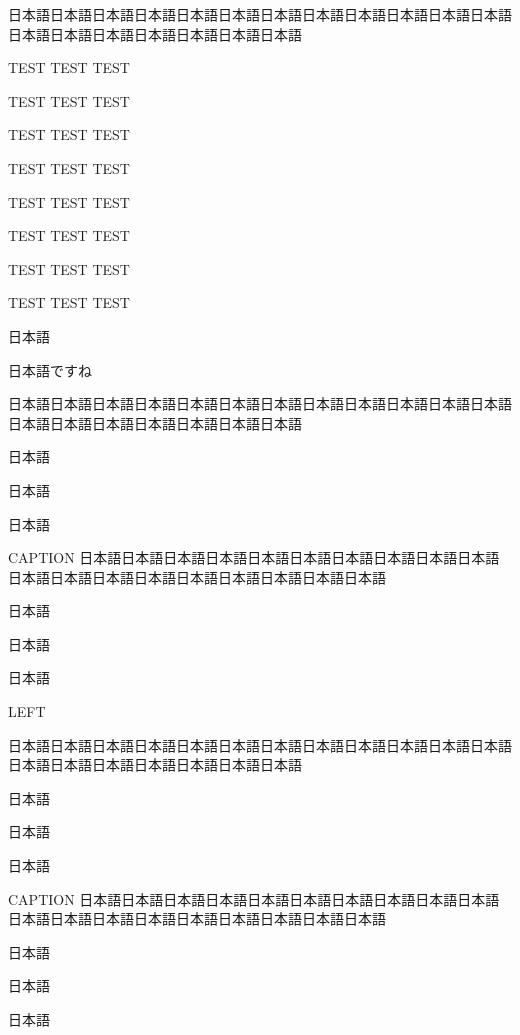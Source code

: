 \begin{rv@dottedbox@nocaption}
日本語日本語日本語日本語日本語日本語日本語日本語日本語日本語日本語日本語日本語日本語日本語日本語日本語日本語日本語

TEST TEST TEST

TEST TEST TEST

TEST TEST TEST

TEST TEST TEST

TEST TEST TEST

TEST TEST TEST

TEST TEST TEST

TEST TEST TEST

日本語

日本語ですね

\end{rv@dottedbox@nocaption}

\clearpage

\begin{rv@bothsidelinebox@nocaption}
日本語日本語日本語日本語日本語日本語日本語日本語日本語日本語日本語日本語日本語日本語日本語日本語日本語日本語日本語

日本語

日本語

日本語
\end{rv@bothsidelinebox@nocaption}

\begin{rv@bothsidelinebox@caption}{CAPTION}
日本語日本語日本語日本語日本語日本語日本語日本語日本語日本語日本語日本語日本語日本語日本語日本語日本語日本語日本語

日本語

日本語

日本語
\end{rv@bothsidelinebox@caption}

\clearpage

LEFT

\begin{rv@leftsidelinebox@nocaption}
日本語日本語日本語日本語日本語日本語日本語日本語日本語日本語日本語日本語日本語日本語日本語日本語日本語日本語日本語

日本語

日本語

日本語
\end{rv@leftsidelinebox@nocaption}

\begin{rv@leftsidelinebox@caption}{CAPTION}
日本語日本語日本語日本語日本語日本語日本語日本語日本語日本語日本語日本語日本語日本語日本語日本語日本語日本語日本語

日本語

日本語

日本語
\end{rv@leftsidelinebox@caption}

